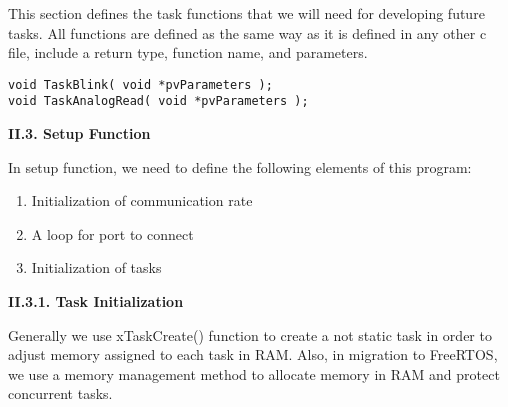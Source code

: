 \documentclass[a4paper,12pt]{report}
\begin{document}
\noindent
This section defines the task functions that we will need for developing future tasks. All functions are defined as the same way as it is defined in any other c file, include a return type, function name, and parameters.

\begin{lstlisting}[style=CStyle]
void TaskBlink( void *pvParameters );
void TaskAnalogRead( void *pvParameters );
\end{lstlisting}

\noindent
\textbf{II.3. Setup Function}

\noindent
In setup function, we need to define the following elements of this program:

\begin{enumerate}
\item Initialization of communication rate
\item A loop for port to connect
\item Initialization of tasks
\end{enumerate} 

\pagebreak
\noindent
\textbf{II.3.1. Task Initialization}

\noindent
Generally we use xTaskCreate() function to create a not static task in order to adjust memory assigned to each task in RAM. Also, in migration to FreeRTOS, we use a memory management method to allocate memory in RAM and protect concurrent tasks. 
\end{document}
